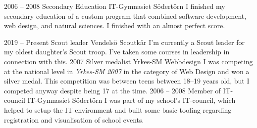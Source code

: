 \documentclass[9pt]{developercv} %
\begin{document}


\begin{entrylist}
  \entry
    {2006 -- 2008}
    {Secondary Education}
    {IT-Gymnasiet Södertörn}
    {I finished my secondary education of a custom program that combined
      software development, web design, and natural sciences. I finished with
      an almost perfect score.}
\end{entrylist}



\begin{entrylist}
  \entry
    {2019 -- Present}
    {Scout leader}
    {Vendelsö Scoutkår}
    {I'm currently a Scout leader for my oldest daughter's Scout troop. I've
      taken some courses in leadership in connection with this.}
  \entry
    {2007}
    {Silver medalist}
    {Yrkes-SM Webbdesign}
    {I was competing at the national level in \textit{Yrkes-SM 2007} in the
      category of Web Design and won a silver medal. This competition was
      between teens between 18--19 years old, but I competed anyway despite
      being 17 at the time.}
  \entry
    {2006 -- 2008}
    {Member of IT-council}
    {IT-Gymnasiet Södertörn}
    {I was part of my school's IT-council, which helped to setup the IT
      environment and built some basic tooling regarding registration and
      visualisation of school events.}
\end{entrylist}

\end{document}

